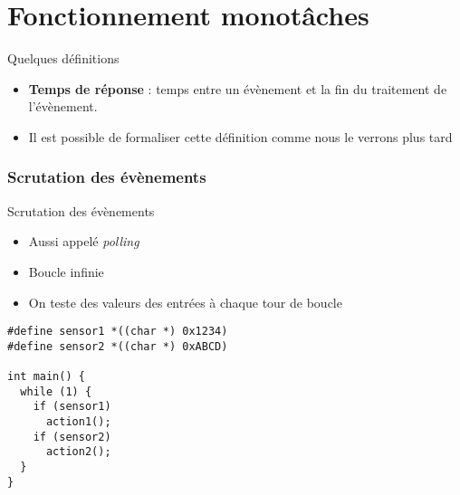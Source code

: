 %
%
%

\part{Fonctionnement monotâches}

\begin{frame}
  \partpage
\end{frame}

\begin{frame}
  \tableofcontents[currentpart]
\end{frame}

\begin{frame}{Quelques définitions}
  \begin{itemize}
  \item \textbf{Temps de réponse} : temps entre un évènement et la fin
    du traitement de l'évènement.
  \item Il est  possible de formaliser cette définition  comme nous le
    verrons plus tard
  \end{itemize}
\end{frame}

\section{Scrutation des évènements}
\begin{frame}[fragile]{Scrutation des évènements}
  \begin{itemize}
  \item Aussi appelé \emph{polling}
  \item Boucle infinie
  \item On teste des valeurs des entrées à chaque tour de boucle
  \end{itemize}
  \begin{lstlisting}
#define sensor1 *((char *) 0x1234)
#define sensor2 *((char *) 0xABCD)

int main() {
  while (1) {
    if (sensor1)
      action1();
    if (sensor2)
      action2();
  }
}
  \end{lstlisting}
\end{frame}

